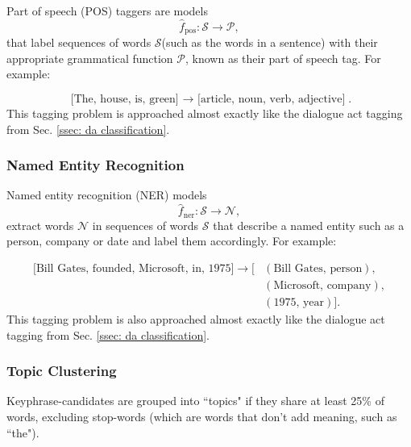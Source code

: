         Part of speech (POS) taggers are models 
        \begin{equation}
          \hat{f}_{\text{pos}}: \mathcal{S} \rightarrow \mathcal{P},
        \end{equation} 
        that label sequences of words $\mathcal{S}$(such as the words in a sentence) with their appropriate grammatical function $\mathcal{P}$, known as their part of speech tag. For example:
        
        \begin{equation*}
        \text{[The, house, is, green] $\rightarrow$ [article, noun, verb, adjective]}.
        \end{equation*}
        This tagging problem is approached almost exactly like the dialogue act tagging from Sec. \ref{ssec: da classification}.
        
        \subsubsection{Named Entity Recognition \label{sssec: NER}}
        Named entity recognition (NER) models
        \begin{equation}
          \hat{f}_{\text{ner}}: \mathcal{S} \rightarrow \mathcal{N},
        \end{equation} 
        extract words $\mathcal{N}$ in sequences of words $\mathcal{S}$ that describe a named entity such as a person, company or date and label them accordingly. For example:
        
        \begin{align*}
        \text{[Bill Gates, founded, Microsoft, in, 1975]} \rightarrow [& (\text{Bill Gates, person}), \\
                                                                       & (\text{Microsoft, company}), \\
                                                                       & (\text{1975, year})].
        \end{align*}
        This tagging problem is also approached almost exactly like the dialogue act tagging from Sec. \ref{ssec: da classification}.
        
        \subsubsection{Topic Clustering}
        
        Keyphrase-candidates are grouped into ``topics" if they share at least 25\% of words, excluding stop-words (which are words that don't add meaning, such as ``the").\cite{bougouin-etal-2013-topicrank}
        
